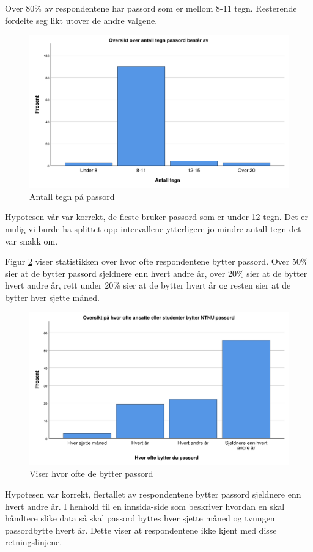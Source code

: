 Over 80\% av respondentene har passord som er mellom 8-11 tegn. Resterende fordelte seg likt utover de andre valgene. 
\begin{figure}[H]
    \centering
    \includegraphics[scale=0.5]{case_2/bilder/spss/antall_tegn.pdf}
    \caption[Antall tegn i passord]{Antall tegn på passord}
    \label{fig:case2-antalltegn}
\end{figure}
Hypotesen vår var korrekt, de fleste bruker passord som er under 12 tegn. Det er mulig vi burde ha splittet opp intervallene ytterligere jo mindre antall tegn det var snakk om. 

Figur \ref{fig:case2-bytter-passord} viser statistikken over hvor ofte respondentene bytter passord. Over 50\% sier at de bytter passord sjeldnere enn hvert andre år, over 20\% sier at de bytter hvert andre år, rett under 20\% sier at de bytter hvert år og resten sier at de bytter hver sjette måned. 
\begin{figure}[H]
    \centering
    \includegraphics[scale=0.5]{case_2/bilder/spss/bytter_passord.pdf}
    \caption[Hvor ofte de bytter passord]{Viser hvor ofte de bytter passord}
    \label{fig:case2-bytter-passord}
\end{figure}
Hypotesen var korrekt, flertallet av respondentene bytter passord sjeldnere enn hvert andre år. I henhold til en innsida-side som beskriver hvordan en skal håndtere slike data så skal passord byttes hver sjette måned og tvungen passordbytte hvert år. Dette viser at respondentene ikke kjent med disse retningslinjene. 

